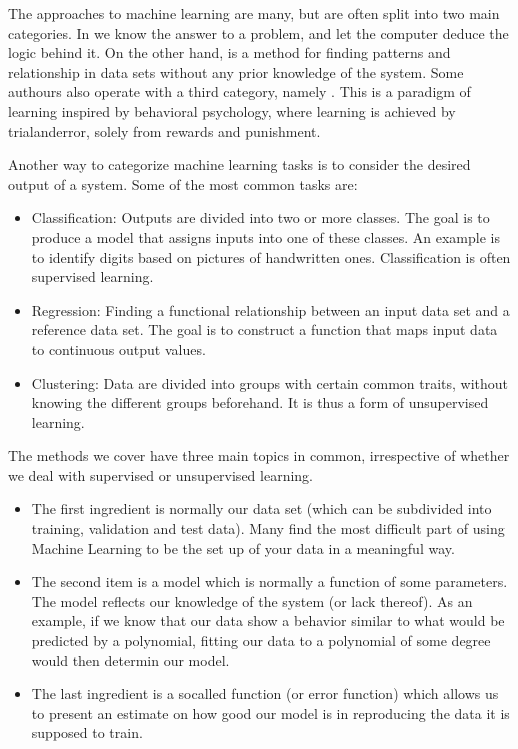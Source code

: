 \documentclass[letterpaper,10pt,english]{sphinxmanual}
\begin{document}
The approaches to machine learning are many, but are often split into
two main categories.  In  we know the answer to a
problem, and let the computer deduce the logic behind it. On the other
hand,  is a method for finding patterns and
relationship in data sets without any prior knowledge of the system.
Some authours also operate with a third category, namely
. This is a paradigm of learning inspired by
behavioral psychology, where learning is achieved by trial\sphinxhyphen{}and\sphinxhyphen{}error,
solely from rewards and punishment.

Another way to categorize machine learning tasks is to consider the
desired output of a system.  Some of the most common tasks are:
\begin{itemize}
\item {} 
Classification: Outputs are divided into two or more classes. The goal is to   produce a model that assigns inputs into one of these classes. An example is to identify  digits based on pictures of hand\sphinxhyphen{}written ones. Classification is often supervised learning.

\item {} 
Regression: Finding a functional relationship between an input data set and a reference data set.   The goal is to construct a function that maps input data to continuous output values.

\item {} 
Clustering: Data are divided into groups with certain common traits, without knowing the different groups beforehand.  It is thus a form of unsupervised learning.

\end{itemize}

The methods we cover have three main topics in common, irrespective of
whether we deal with supervised or unsupervised learning.
\begin{itemize}
\item {} 
The first ingredient is normally our data set (which can be subdivided into training, validation  and test data). Many find the most difficult part of using Machine Learning to be the set up of your data in a meaningful way.

\item {} 
The second item is a model which is normally a function of some parameters.  The model reflects our knowledge of the system (or lack thereof). As an example, if we know that our data show a behavior similar to what would be predicted by a polynomial, fitting our data to a polynomial of some degree would then determin our model.

\item {} 
The last ingredient is a so\sphinxhyphen{}called  function (or error function) which allows us to present an estimate on how good our model is in reproducing the data it is supposed to train.

\end{itemize}
\end{document}
